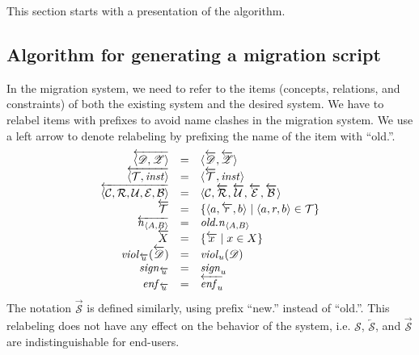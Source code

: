 \documentclass[runningheads]{llncs}
\newcommand{\id}[1]{\text{\it #1\/}}
\newcommand{\instance}{\mathbin{\id{inst}}}
\newcommand{\viol}[2]{\violC{#1}(#2)}
\newcommand{\violC}[1]{\id{viol}_{#1}}
\newcommand{\sign}[1]{\id{sign}_{#1}}
\newcommand{\enfRel}[1]{\id{enf}_{#1}}
\newcommand{\declare}[3]{\id{#1}_{\pair{#2}{#3}}}
\newcommand{\pair}[2]{\langle{#1},{#2}\rangle}
\newcommand{\triple}[3]{\langle{#1},{#2},{#3}\rangle}
\newcommand{\quintuple}[5]{\langle{#1},{#2},{#3},{#4},{#5}\rangle}
\newcommand{\concepts}{\mathcal{C}}
\newcommand{\rels}{\mathcal{R}}   %
\newcommand{\triples}{\mathcal{T}}
\newcommand{\rules}{\mathcal{U}}
\newcommand{\transactions}{\mathcal{E}}
\newcommand{\busConstraints}{\mathcal{B}}
\newcommand{\dataset}{\mathscr{D}}
\newcommand{\schema}{\mathscr{Z}}
\newcommand{\infsys}{\mathscr{S}}
\begin{document}
   This section starts with a presentation of the algorithm.

\subsection{Algorithm for generating a migration script}
   In the migration system, we need to refer to the items (concepts, relations, and constraints) of both the existing system and the desired system.
   We have to relabel items with prefixes to avoid name clashes in the migration system.
   We use a left arrow to denote relabeling by prefixing the name of the item with ``old.''.
\begin{equation}
   \begin{array}[m]{rcl}
      \overleftarrow{\pair{\dataset}{\schema}}&=&\pair{\overleftarrow{\dataset}}{\overleftarrow{\schema}}\\
      \overleftarrow{\pair{\triples}{\instance}}&=&\pair{\overleftarrow{\triples}}{\instance}\\
      \overleftarrow{\quintuple{\concepts}{\rels}{\rules}{\transactions}{\busConstraints}}&=&\quintuple{\concepts}{\overleftarrow{\rels}}{\overleftarrow{\rules}}{\overleftarrow{\transactions}}{\overleftarrow{\busConstraints}}\\
      \overleftarrow{\triples}&=&\{\triple{a}{\overleftarrow{r}}{b}\mid\triple{a}{r}{b}\in\triples\}\\
      \overleftarrow{\declare{n}{A}{B}}&=&\declare{old.n}{A}{B}\\
      \overleftarrow{X}&=&\{\overleftarrow{x}\mid x\in X\}\\
      \viol{\overleftarrow{u}}{\overleftarrow{\dataset}}&=&\viol{u}{\dataset}\\
      \sign{\overleftarrow{u}}&=&\sign{u}\\
      \enfRel{\overleftarrow{u}}&=&\overleftarrow{\enfRel{u}}
   \end{array}
\end{equation}
   The notation $\overrightarrow{\infsys}$ is defined similarly, using prefix ``new.'' instead of ``old.''.
   This relabeling does not have any effect on the behavior of the system, i.e. $\infsys$, $\overleftarrow{\infsys}$, and $\overrightarrow{\infsys}$ are indistinguishable for end-users.
\end{document}
